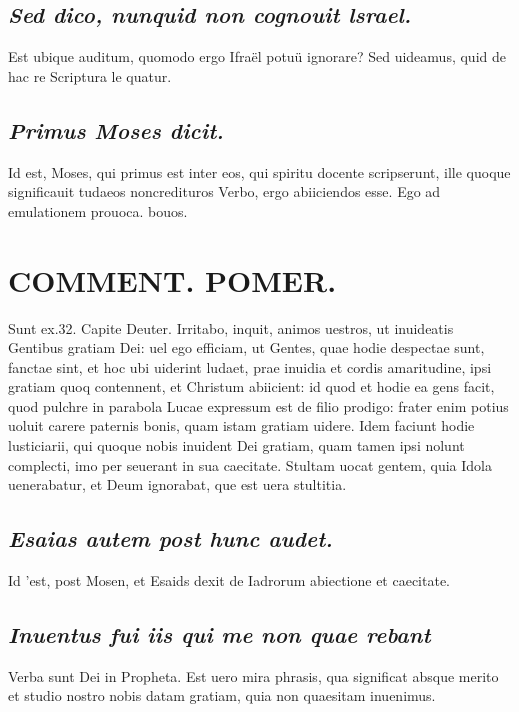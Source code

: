 \documentclass{article}
\begin{document}
\begin{pages}
\subsection*{\textit{Sed dico, nunquid non cognouit lsrael. }}\pstart Est ubique auditum, quomodo ergo Ifraël potuü ignorare? Sed uideamus, quid de hac re Scriptura le quatur.   \pend
{}
{}
\subsection*{\textit{Primus Moses dicit. }}\pstart Id est, Moses, qui primus est inter eos, qui spiritu docente scripserunt, ille quoque significauit tudaeos noncredituros Verbo, ergo abiiciendos esse.  \pend\pstart Ego ad emulationem prouoca. bouos.  \pend
\section*{COMMENT. POMER.  }\pstart Sunt ex.32. Capite Deuter. Irritabo, inquit, animos uestros, ut inuideatis Gentibus gratiam Dei: uel ego efficiam, ut Gentes, quae hodie despectae sunt, fanctae sint, et hoc ubi uiderint ludaet, prae inuidia et cordis amaritudine, ipsi gratiam quoq contennent, et Christum abiicient: id quod et hodie ea gens facit, quod pulchre in parabola Lucae expressum est de filio prodigo: frater enim potius uoluit carere paternis bonis, quam istam gratiam uidere. Idem faciunt hodie lusticiarii, qui quoque nobis inuident Dei gratiam, quam tamen ipsi nolunt complecti, imo per seuerant in sua caecitate. Stultam uocat gentem, quia Idola uenerabatur, et Deum ignorabat, que est uera stultitia.   \pend
{}
{}
\subsection*{\textit{Esaias autem post hunc audet. }}\pstart Id 'est, post Mosen, et Esaids dexit de Iadrorum abiectione et caecitate.  \pend
{}
{}
\subsection*{\textit{Inuentus fui iis qui me non quae rebant }}\pstart Verba sunt Dei in Propheta. Est uero mira phrasis, qua significat absque merito et studio nostro nobis datam gratiam, quia non quaesitam inuenimus.  \pend
{}
{}

\end{pages}
\end{document}
